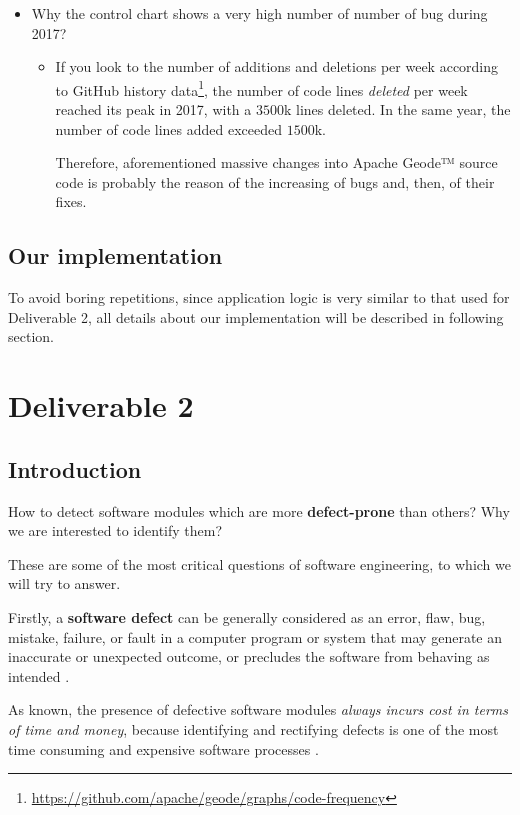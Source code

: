\documentclass[sigconf]{acmart}
\begin{document}
\begin{itemize}
\item Why the control chart shows a very high number of number of bug during 2017?
\begin{itemize}
\item If you look to the number of additions and deletions per week according to GitHub history data\footnote{\url{https://github.com/apache/geode/graphs/code-frequency}}, the number of code lines \textit{deleted} per week reached its peak in 2017, with a $3500$k lines deleted. In the same year, the number of code lines added exceeded $1500$k.

Therefore, aforementioned massive changes into Apache Geode™ source code is probably the reason of the increasing of bugs and, then, of their fixes.

\end{itemize}
\end{itemize}

\subsection{Our implementation}

To avoid boring repetitions, since application logic is very similar to that used for Deliverable 2, all details about our implementation will be described in following section. 

\section{Deliverable 2}

\subsection{Introduction}

How to detect software modules which are more \textbf{defect-prone} than others? Why we are interested to identify them? 

These are some of the most critical questions of software engineering, to which we will try to answer. 

Firstly, a \textbf{software defect} can be generally considered as an error, flaw, bug, mistake, failure, or fault in a computer program or system that may generate an inaccurate or unexpected outcome, or precludes the software from behaving as intended \cite{SoftwareDefectPredictionRawat}.

As known, the presence of defective software modules \textit{always incurs cost in terms of time and money}, because identifying and rectifying defects is one of the most time consuming and expensive software processes \cite{SoftwareDefectPredictionRawat}.
\end{document}
